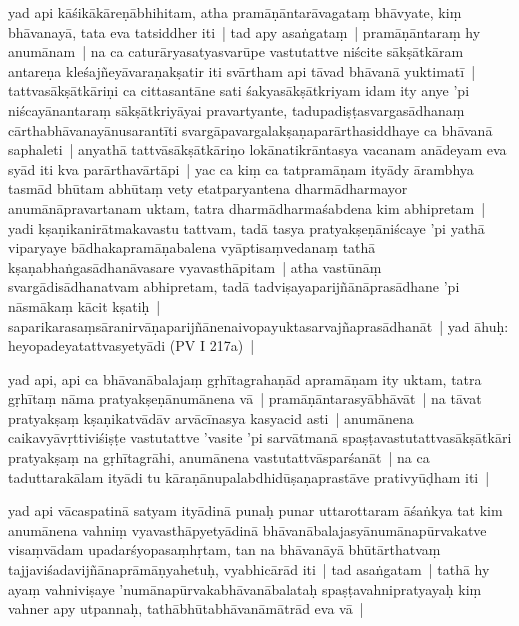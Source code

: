 \documentclass[article,12pt,a4paper]{memoir}%
\newcommand{\persName}[1]{#1}
\newcounter{parCount}
\begin{document}
	  
	  \pstart \leavevmode%
	\label{thakur75-18.18}yad api kāśikākāreṇābhihitam, atha pramāṇāntarāvagataṃ bhāvyate, kiṃ bhāvanayā, tata eva tatsiddher iti | tad apy asaṅgataṃ | pramāṇāntaraṃ hy anumānam | na ca caturāryasatyasvarūpe vastutattve niścite sākṣātkāram antareṇa kleśajñeyāvaraṇakṣatir iti svārtham api tāvad bhāvanā yuktimatī | tattvasākṣātkāriṇi ca cittasantāne sati śakyasākṣātkriyam idam ity anye 'pi niścayānantaraṃ sākṣātkriyāyai pravartyante, tadupadiṣṭasvargasādhanaṃ cārthabhāvanayānusarantīti svargāpavargalakṣaṇaparārthasiddhaye ca bhāvanā saphaleti | anyathā tattvāsākṣātkāriṇo lokānatikrāntasya vacanam anādeyam eva syād iti kva parārthavārtāpi | yac ca kiṃ ca tatpramāṇam ityādy ārambhya tasmād bhūtam abhūtaṃ vety etatparyantena dharmādharmayor anumānāpravartanam uktam, tatra dharmādharmaśabdena kim abhipretam | yadi kṣaṇikanirātmakavastu tattvam, tadā tasya pratyakṣeṇāniścaye 'pi yathā viparyaye bādhakapramāṇabalena vyāptisaṃvedanaṃ tathā kṣaṇabhaṅgasādhanāvasare vyavasthāpitam | atha vastūnāṃ svargādisādhanatvam abhipretam, tadā tadviṣayaparijñānāprasādhane 'pi nāsmākaṃ kācit kṣatiḥ | saparikarasaṃsāranirvāṇaparijñānenaivopayuktasarvajñaprasādhanāt | yad āhuḥ: heyopadeyatattvasyetyādi (PV I 217a) | 
	{}
	\pend%
      

	  
	  \pstart \leavevmode%
	\label{thakur75-18.32}yad api, api ca bhāvanābalajaṃ gṛhītagrahaṇād apramāṇam ity uktam, tatra gṛhītaṃ nāma pratyakṣeṇānumānena vā | pramāṇāntarasyābhāvāt | na tāvat pratyakṣaṃ kṣaṇikatvādāv arvācīnasya kasyacid asti | anumānena caikavyāvṛttiviśiṣṭe vastutattve 'vasite 'pi sarvātmanā spaṣṭavastutattvasākṣātkāri pratyakṣaṃ na gṛhītagrāhi, anumānena vastutattvāsparśanāt | na ca taduttarakālam ityādi tu kāraṇānupalabdhidūṣaṇaprastāve prativyūḍham iti | 
	{}
	\pend%
      

	  
	  \pstart \leavevmode%
	\label{thakur75-19.5}yad api \persName{vācaspatinā} satyam ityādinā punaḥ punar uttarottaram āśaṅkya tat kim anumānena vahniṃ vyavasthāpyetyādinā bhāvanābalajasyānumānapūrvakatve visaṃvādam upadarśyopasaṃhṛtam, tan na bhāvanāyā bhūtārthatvaṃ tajjaviśadavijñānaprāmāṇyahetuḥ, vyabhicārād iti | tad asaṅgatam | tathā hy ayaṃ vahniviṣaye 'numānapūrvakabhāvanābalataḥ spaṣṭavahnipratyayaḥ kiṃ vahner apy utpannaḥ, tathābhūtabhāvanāmātrād eva vā |
	{}
	\pend%
      
\end{document}
